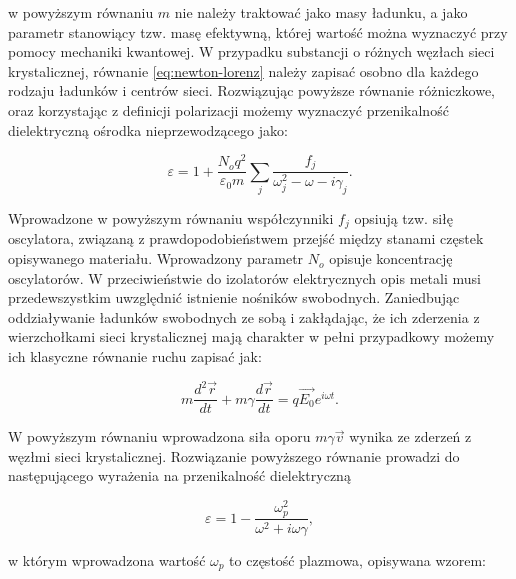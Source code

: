 w powyższym równaniu $m$ nie należy traktować jako masy ładunku, a jako parametr stanowiący tzw. masę efektywną, której wartość można wyznaczyć przy pomocy mechaniki kwantowej. W przypadku substancji o różnych węzłach sieci krystalicznej, równanie \ref{eq:newton-lorenz} należy zapisać osobno dla każdego rodzaju ładunków i centrów sieci. Rozwiązując powyższe równanie różniczkowe, oraz korzystając z definicji polarizacji możemy wyznaczyć przenikalność dielektryczną ośrodka nieprzewodzącego jako:

\begin{equation}
\varepsilon = 1 + \frac{N_o q^2}{\varepsilon_0 m} \sum_j \frac{f_j}{\omega_j^2 - \omega - i \gamma_j}.
\label{eq:lorenz}
\end{equation}

Wprowadzone w powyższym równaniu współczynniki $f_j$ opsiują tzw. siłę oscylatora, związaną z prawdopodobieństwem przejść między stanami częstek opisywanego materiału. Wprowadzony parametr $N_o$ opisuje koncentrację oscylatorów.  W przeciwieństwie do izolatorów elektrycznych opis metali musi przedewszystkim uwzględnić istnienie nośników swobodnych. Zaniedbując oddziaływanie ładunków swobodnych ze sobą i zakłądając, że ich zderzenia z wierzchołkami sieci krystalicznej mają charakter w pełni przypadkowy możemy ich klasyczne równanie ruchu zapisać jak:

\begin{equation}
m \frac{d^2\vec{r}}{dt} + m \gamma \frac{d\vec{r}}{dt} = q \vec{E_0}e^{i\omega t}.
\label{eq:newton-drude}
\end{equation}

W powyższym równaniu wprowadzona siła oporu $m \gamma \vec{v}$ wynika ze zderzeń z węzłmi sieci krystalicznej. Rozwiązanie powyższego równanie prowadzi do następującego wyrażenia na przenikalność dielektryczną

\begin{equation}
\varepsilon= 1 - \frac{\omega_p^2}{\omega^2+i\omega \gamma},
\label{eq:drude}
\end{equation}

w którym wprowadzona wartość $\omega_p$ to częstość plazmowa, opisywana wzorem:

